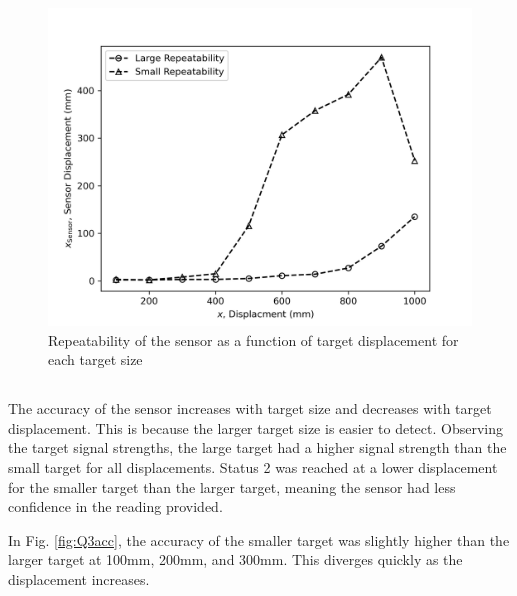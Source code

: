 \begin{figure}[h]
    \centering
    \includegraphics[width=0.6\linewidth]{matplotlib/Q3rep.png}
    \caption{Repeatability of the sensor as a function of target displacement for each target size}
    \label{fig:Q3rep}
\end{figure}

\FloatBarrier
\subsection{}

The accuracy of the sensor increases with target size and decreases with target displacement. This is because the larger target size is easier to detect.
Observing the target signal strengths, the large target had a higher signal strength than the small target for all displacements. Status 2 was reached
at a lower displacement for the smaller target than the larger target, meaning the sensor had less confidence in the reading provided.

In Fig. \ref{fig:Q3acc}, the accuracy of the smaller target was slightly higher than the larger target at 100mm, 200mm, and 300mm. This diverges
quickly as the displacement increases.  